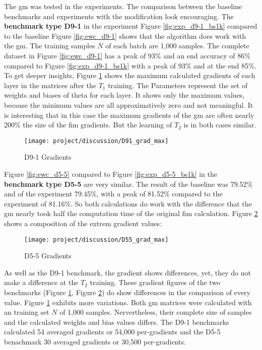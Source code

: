 The \acrshort{gm} was tested in the experiments.
The comparison between the baseline benchmarks and experiments with the modification look encouraging.
\newline
The \textbf{benchmark type D9-1} in the experiment Figure \ref{fig:exp_d9-1_bs1k} compared to the baseline Figure \ref{fig:ewc_d9-1} shows that the algorithm does work with the \acrshort{gm}.
The training samples $N$ of each batch are 1,000 samples.
The complete dataset in Figure \ref{fig:ewc_d9-1} has a peak of 93\% and an end accuracy of 86\% compared to Figure \ref{fig:exp_d9-1_bs1k} with a peak of 93\% and at the end 85\%.
\newline
To get deeper insights, Figure \ref{fig:dis_d91} shows the maximum calculated gradients of each layer in the matrices after the $T_1$ training.
The Parameters represent the set of weights and biases of theta for each layer.
It shows only the maximum values, because the minimum values are all approximatively zero and not meaningful.
It is interesting that in this case the maximum gradients of the \acrshort{gm} are often nearly 200\% the size of the \acrshort{fim} gradients.
But the learning of $T_2$ is in both cases similar.

\begin{figure}[H]
    \centering
    \texttt{[image: project/discussion/D91\_grad\_max]}
    \caption{D9-1 Gradients}
    \label{fig:dis_d91}
\end{figure}

Figure \ref{fig:ewc_d5-5} compared to Figure \ref{fig:exp_d5-5_bs1k} in the \textbf{benchmark type D5-5} are very similar.
The result of the baseline was 79.52\% and of the experiment 79.45\%, with a peak of 81.52\% compared to the experiment of 81.16\%.
So both calculations do work with the difference that the \acrshort{gm} nearly took half the computation time of the original \acrshort{fim} calculation.
Figure \ref{fig:dis_d55} shows a composition of the extrem gradient values:

\begin{figure}[H]
    \centering
    \texttt{[image: project/discussion/D55\_grad\_max]}
    \caption{D5-5 Gradients}
    \label{fig:dis_d55}
\end{figure}

As well as the D9-1 benchmark, the gradient shows differences, yet, they do not make 
a difference at the $T_2$ training.
\newline
These gradient figures of the two benchmarks (Figure \ref{fig:dis_d91}, Figure \ref{fig:dis_d55}) do show differences in the comparison of every value.
Figure \ref{fig:dis_d91} exhibits more variations.
Both \acrshort{gm} matrices were calculated with an training set $N$ of 1,000 samples.
Nervertheless, their complete size of samples and the calculated weights and bias values differs.
The D9-1 benchmarks calculated 54 averaged gradients or 54,000 per-gradients and the D5-5 benachmark 30 averaged gradients or 30,500 per-gradients.

